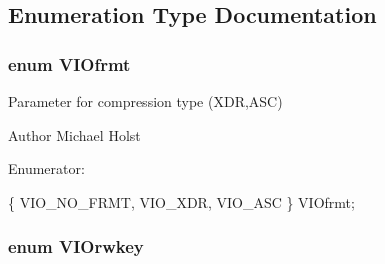 \subsection{Enumeration Type Documentation}
\subsubsection[{V\-I\-Ofrmt}]{\setlength{\rightskip}{0pt plus 5cm}enum {\bf V\-I\-Ofrmt}}\label{a00028_gabfa72aea464435d52c14c43ebd5e363b}


Parameter for compression type (X\-D\-R,A\-S\-C) 

\begin{DoxyAuthor}{Author}
Michael Holst 
\end{DoxyAuthor}
\begin{Desc}
\item[Enumerator\-: ]\par
\begin{description}
\item[{\em 
V\-I\-O\-\_\-\-N\-O\-\_\-\-F\-R\-M\-T\label{a00028_ggabfa72aea464435d52c14c43ebd5e363bade52aaa65f920c341c443993f0898b73}
}]\item[{\em 
V\-I\-O\-\_\-\-X\-D\-R\label{a00028_ggabfa72aea464435d52c14c43ebd5e363ba35f912228eb6c27fc632520ae9629924}
}]\item[{\em 
V\-I\-O\-\_\-\-A\-S\-C\label{a00028_ggabfa72aea464435d52c14c43ebd5e363baec02355c47d63dead444522a814209f4}
}]\end{description}
\end{Desc}


\begin{DoxyCode}
                     \{
    VIO_NO_FRMT,
    VIO_XDR,
    VIO_ASC
\} VIOfrmt;
\end{DoxyCode}
\subsubsection[{V\-I\-Orwkey}]{\setlength{\rightskip}{0pt plus 5cm}enum {\bf V\-I\-Orwkey}}\label{a00028_gaf7330032d12db3359c24f79c9c2d4e24}



